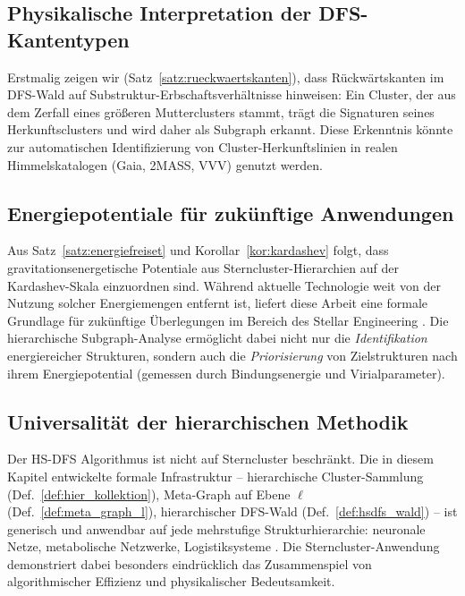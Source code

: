 ﻿\documentclass[a4paper,12pt]{report}
\theoremstyle{definition}
\begin{document}
\subsection{Physikalische Interpretation der DFS-Kantentypen}

Erstmalig zeigen wir (Satz~\ref{satz:rueckwaertskanten}), dass Rückwärtskanten im DFS-Wald auf Substruktur-Erbschaftsverhältnisse hinweisen: Ein Cluster, der aus dem Zerfall eines größeren Mutterclusters stammt, trägt die Signaturen seines Herkunftsclusters und wird daher als Subgraph erkannt. Diese Erkenntnis könnte zur automatischen Identifizierung von Cluster-Herkunftslinien in realen Himmelskatalogen (Gaia, 2MASS, VVV) genutzt werden.

\subsection{Energiepotentiale für zukünftige Anwendungen}

Aus Satz~\ref{satz:energiefreiset} und Korollar~\ref{kor:kardashev} folgt, dass gravitationsenergetische Potentiale aus Sterncluster-Hierarchien auf der Kardashev-Skala einzuordnen sind. Während aktuelle Technologie weit von der Nutzung solcher Energiemengen entfernt ist, liefert diese Arbeit eine formale Grundlage für zukünftige Überlegungen im Bereich des Stellar Engineering \cite{dyson1960, kardashev1964}. Die hierarchische Subgraph-Analyse ermöglicht dabei nicht nur die \emph{Identifikation} energiereicher Strukturen, sondern auch die \emph{Priorisierung} von Zielstrukturen nach ihrem Energiepotential (gemessen durch Bindungsenergie und Virialparameter).

\subsection{Universalität der hierarchischen Methodik}

Der HS-DFS Algorithmus ist nicht auf Sterncluster beschränkt. Die in diesem Kapitel entwickelte formale Infrastruktur -- hierarchische Cluster-Sammlung (Def.~\ref{def:hier_kollektion}), Meta-Graph auf Ebene $\ell$ (Def.~\ref{def:meta_graph_l}), hierarchischer DFS-Wald (Def.~\ref{def:hsdfs_wald}) -- ist generisch und anwendbar auf jede mehrstufige Strukturhierarchie: neuronale Netze, metabolische Netzwerke, Logistiksysteme \cite{epp2026msubgraph}. Die Sterncluster-Anwendung demonstriert dabei besonders eindrücklich das Zusammenspiel von algorithmischer Effizienz und physikalischer Bedeutsamkeit.
\end{document}

